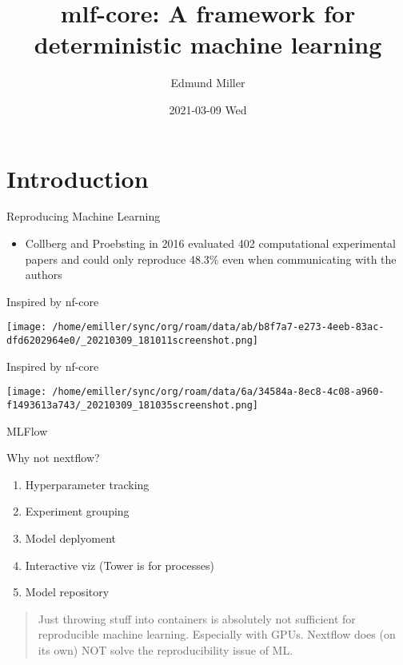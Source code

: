 \documentclass[bigger]{beamer}
\author{Edmund Miller}
\date{2021-03-09 Wed}
\title{mlf-core: A framework for deterministic machine learning}
\begin{document}
\maketitle

\section{Introduction}
\label{sec:orga04fa0e}

\begin{frame}[label={sec:orgad983c1}]{Reproducing Machine Learning}
\begin{itemize}
\item Collberg and Proebsting in 2016 evaluated 402 computational experimental
papers and could only reproduce 48.3\% even when communicating with the authors
\end{itemize}
\end{frame}
\begin{frame}[label={sec:orgd33d8f5}]{Inspired by nf-core}
\begin{center}
\texttt{[image: /home/emiller/sync/org/roam/data/ab/b8f7a7-e273-4eeb-83ac-dfd6202964e0/\_20210309\_181011screenshot.png]}
\end{center}
\end{frame}

\begin{frame}[label={sec:org219c3c5}]{Inspired by nf-core}
\begin{center}
\texttt{[image: /home/emiller/sync/org/roam/data/6a/34584a-8ec8-4c08-a960-f1493613a743/\_20210309\_181035screenshot.png]}
\end{center}
\end{frame}

\begin{frame}[label={sec:org2d10e84}]{MLFlow}
\begin{block}{Why not nextflow?}
\begin{enumerate}
\item Hyperparameter tracking
\item Experiment grouping
\item Model deplyoment
\item Interactive viz (Tower is for processes)
\item Model repository
\end{enumerate}


\begin{quote}
Just throwing stuff into containers is absolutely not sufficient for
reproducible machine learning. Especially with GPUs. Nextflow does (on its own)
NOT solve the reproducibility issue of ML.
\end{quote}
\end{block}
\end{frame}
\end{document}
